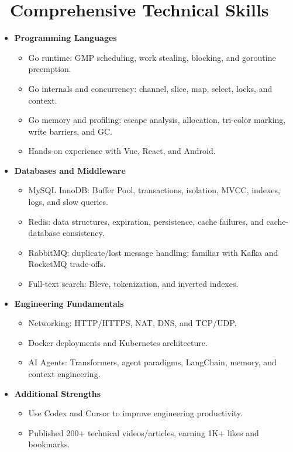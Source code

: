 \documentclass{resume}
\begin{document}
\section{\faCogs\ Comprehensive Technical Skills}
\begin{itemize}
    \item \textbf{Programming Languages}
    \begin{itemize}
        \item Go runtime: GMP scheduling, work stealing, blocking, and goroutine preemption.
        \item Go internals and concurrency: channel, slice, map, select, locks, and context.
        \item Go memory and profiling: escape analysis, allocation, tri-color marking, write barriers, and GC.
        \item Hands-on experience with Vue, React, and Android.
    \end{itemize}

    \item \textbf{Databases and Middleware}
    \begin{itemize}
        \item MySQL InnoDB: Buffer Pool, transactions, isolation, MVCC, indexes, logs, and slow queries.
        \item Redis: data structures, expiration, persistence, cache failures, and cache-database consistency.
        \item RabbitMQ: duplicate/lost message handling; familiar with Kafka and RocketMQ trade-offs.
        \item Full-text search: Bleve, tokenization, and inverted indexes.
    \end{itemize}

    \item \textbf{Engineering Fundamentals}
    \begin{itemize}
        \item Networking: HTTP/HTTPS, NAT, DNS, and TCP/UDP.
        \item Docker deployments and Kubernetes architecture.
        \item AI Agents: Transformers, agent paradigms, LangChain, memory, and context engineering.
    \end{itemize}

    \item \textbf{Additional Strengths}
    \begin{itemize}
        \item Use Codex and Cursor to improve engineering productivity.
        \item Published 200+ technical videos/articles, earning 1K+ likes and bookmarks.
    \end{itemize}
\end{itemize}
\end{document}
